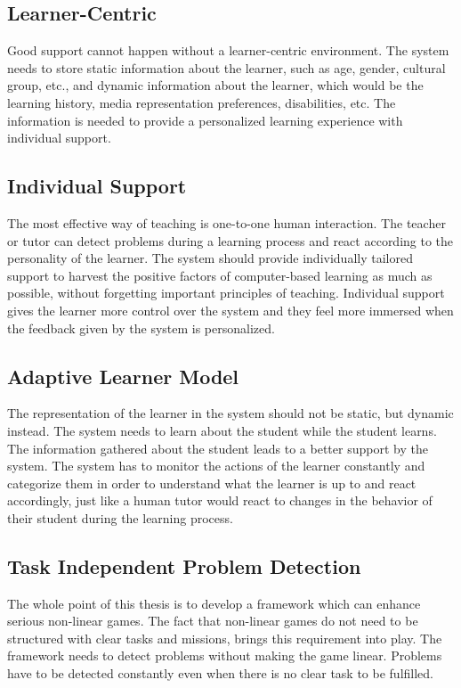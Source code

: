 
\subsection{Learner-Centric}
Good support cannot happen without a learner-centric environment. The system
needs to store static information about the learner, such as age, gender,
cultural group, etc., and dynamic information about the learner, which would
be the learning history, media representation preferences, disabilities, etc. The
information is needed to provide a personalized learning experience with
individual support.

\subsection{Individual Support}
The most effective way of teaching is one-to-one human interaction. The
teacher or tutor can detect problems during a learning process and react
according to the personality of the learner. The system should provide
individually tailored support to harvest the positive factors of computer-based learning
as much as possible, without forgetting important principles of teaching.
Individual support gives the learner more control over the system and they feel
more immersed when the feedback given by the system is personalized.

\subsection{Adaptive Learner Model}
The representation of the learner in the system should not be static, but
dynamic instead. The system needs to learn about the student while the student
learns. The information gathered about the student leads to a better
support by the system. The system has to monitor the actions of the learner
constantly and categorize them in order to understand what the learner is up
to and react accordingly, just like a human tutor would react to changes in
the behavior of their student during the learning process.

\subsection{Task Independent Problem Detection}
The whole point of this thesis is to develop a framework which can enhance
serious non-linear games. The fact that non-linear games do not need to be
structured with clear tasks and missions, brings this requirement into play.
The framework needs to detect problems without making the game linear.
Problems have to be detected constantly even when there is no clear task to be
fulfilled.

